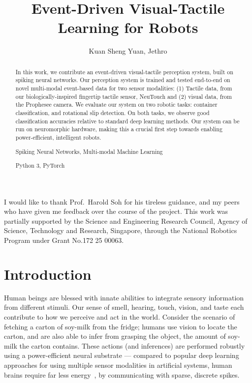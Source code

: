\documentclass[fyp]{socreport}
\begin{document}
\author{Kuan Sheng Yuan, Jethro}
\title{Event-Driven Visual-Tactile Learning for Robots}

\begin{acknowledgement}
  I would like to thank Prof.\ Harold Soh for his tireless
  guidance, and my peers who have given me feedback over the course of the
  project. This work was partially supported by the Science and Engineering
  Research Council, Agency of Science, Technology and Research, Singapore,
  through the National Robotics Program under Grant No.172 25 00063.
\end{acknowledgement}
\maketitle

\begin{abstract}
  In this work, we contribute an event-driven visual-tactile perception system,
  built on spiking neural networks. Our perception system is trained and tested
  end-to-end on novel multi-modal event-based data for two sensor modalities:
  (1) Tactile data, from our biologically-inspired fingertip tactile sensor,
  NeuTouch and (2) visual data, from the Prophesee camera. We evaluate our
  system on two robotic tasks: container classification, and rotational slip
  detection. On both tasks, we observe good classification accuracies relative
  to standard deep learning methods. Our system can be run on neuromorphic
  hardware, making this a crucial first step towards enabling power-efficient,
  intelligent robots.

  \begin{keywords}
    Spiking Neural Networks, Multi-modal Machine Learning
  \end{keywords}

  \begin{implement} Python 3, PyTorch
  \end{implement}
\end{abstract}

\listoffigures
\listoftables
\tableofcontents

\chapter{Introduction\label{cha:intro}}

Human beings are blessed with innate abilities to integrate sensory information
from different stimuli. Our sense of smell, hearing, touch, vision, and taste
each contribute to how we perceive and act in the world. Consider the scenario
of fetching a carton of soy-milk from the fridge; humans use vision to locate
the carton, and are also able to infer from grasping the object, the amount of
soy-milk the carton contains. These actions (and inferences) are performed
robustly using a power-efficient neural substrate --- compared to popular deep
learning approaches for using multiple sensor modalities in artificial systems,
human brains require far less energy~\cite{li2016energyefficiency}, by
communicating with sparse, discrete spikes.
\end{document}
